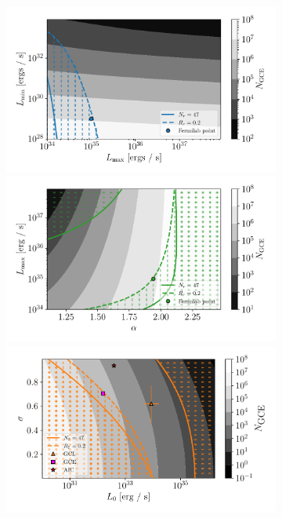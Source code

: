 \documentclass[a4paper,11pt]{article}
\begin{document}
\begin{figure}
    \centering
    \begin{subfigure}[b]{0.49\textwidth}
        \includegraphics[width=\textwidth]{figs/power-law-step.pdf}
        \includegraphics[width=\textwidth]{figs/power-law-alpha-step.pdf}
        \includegraphics[width=\textwidth]{figs/log-normal-step.pdf}

\end{subfigure}
\end{figure}
\end{document}
